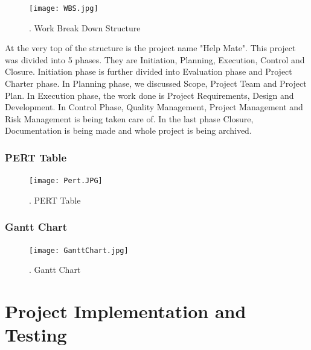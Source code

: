\documentclass{article}
\begin{document}
\begin{flushleft}
\begin{figure}[!ht]
              \texttt{[image: WBS.jpg]}
              \renewcommand{\thefigure}{ \thesubsection.\arabic{figure}}
              \caption{ .  Work Break Down Structure}
            \end{figure}
            \bigskip
            At the very top of the structure is the project name "Help Mate". This project was divided into 5 phases. They are Initiation, Planning, Execution, Control and Closure. Initiation phase is further divided into Evaluation phase and Project Charter phase. In Planning phase, we discussed Scope, Project Team and Project Plan. In Execution phase, the work done is Project Requirements, Design and Development. In Control Phase, Quality Management, Project Management and Risk Management is being taken care of. In the last phase Closure, Documentation is being made and whole project is being archived.
            
            
            
            
            
            \newpage
            
            \subsubsection{PERT Table}
            \begin{figure}[!ht]
              
              \texttt{[image: Pert.JPG]}
              \renewcommand{\thefigure}{ \thesubsection.\arabic{figure}}
              \caption{ .  PERT Table}
            \end{figure}
            

            \subsubsection{Gantt Chart}
            \begin{figure}[!ht]
              
              \texttt{[image: GanttChart.jpg]}
              \renewcommand{\thefigure}{ \thesubsection.\arabic{figure}}
              \caption{ .  Gantt Chart}
            \end{figure}
            
            \newpage
            
    \section{Project Implementation and Testing}

\end{flushleft}
\end{document}
